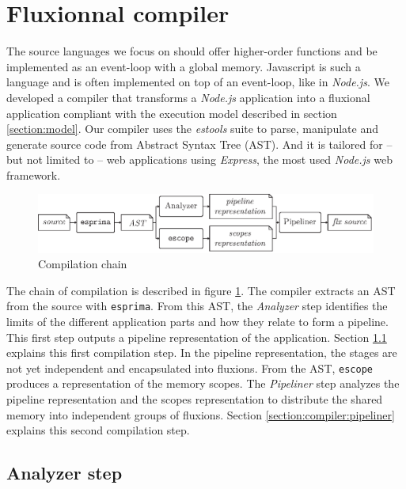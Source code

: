 \section{Fluxionnal compiler} \label{section:compiler}

The source languages we focus on should offer higher-order functions and be implemented as an event-loop with a global memory.
Javascript is such a language and is often implemented on top of an event-loop, like in \textit{Node.js}.
We developed a compiler that transforms a \textit{Node.js} application into a fluxional application compliant with the execution model described in section \ref{section:model}.
Our compiler uses the \textit{estools} suite to parse, manipulate and generate source code from Abstract Syntax Tree (AST).
And it is tailored for -- but not limited to -- web applications using \textit{Express}, the most used \textit{Node.js} web framework.

\begin{figure}
  \includegraphics[width=\linewidth]{compiler-stream.ps}
  \caption{Compilation chain}
  \label{fig:compilation}
\end{figure}

The chain of compilation is described in figure \ref{fig:compilation}.
The compiler extracts an AST from the source with \texttt{esprima}.
From this AST, the \textit{Analyzer} step identifies the limits of the different application parts and how they relate to form a pipeline.
This first step outputs a pipeline representation of the application.
Section \ref{section:compiler:analyzer} explains this first compilation step.
In the pipeline representation, the stages are not yet independent and encapsulated into fluxions.
From the AST, \texttt{escope} produces a representation of the memory scopes.
The \textit{Pipeliner} step analyzes the pipeline representation and the scopes representation to distribute the shared memory into independent groups of fluxions.
Section \ref{section:compiler:pipeliner} explains this second compilation step.

\subsection{Analyzer step} \label{section:compiler:analyzer}

